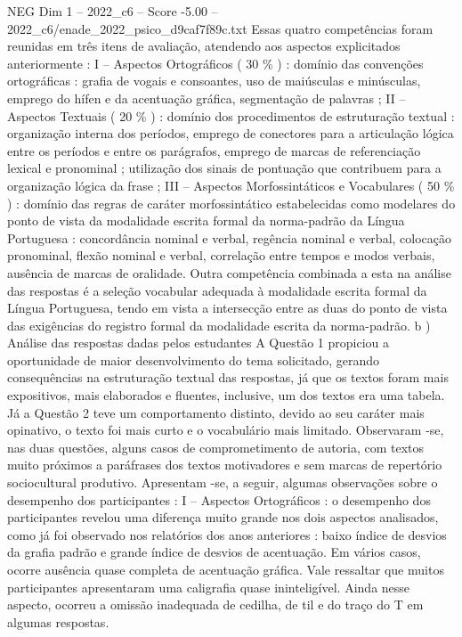 \begin{textsample}{NEG Dim 1 – 2022\_c6 – Score -5.00 – 2022\_c6/enade\_2022\_psico\_d9caf7f89c.txt}
Essas quatro competências foram reunidas em três itens de avaliação, atendendo aos aspectos explicitados anteriormente : I – Aspectos Ortográficos ( 30 \% ) : domínio das convenções ortográficas : grafia de vogais e consoantes, uso de maiúsculas e minúsculas, emprego do hífen e da acentuação gráfica, segmentação de palavras ; II – Aspectos Textuais ( 20 \% ) : domínio dos procedimentos de estruturação textual : organização interna dos períodos, emprego de conectores para a articulação lógica entre os períodos e entre os parágrafos, emprego de marcas de referenciação lexical e pronominal ; utilização dos sinais de pontuação que contribuem para a organização lógica da frase ; III – Aspectos Morfossintáticos e Vocabulares ( 50 \% ) : domínio das regras de caráter morfossintático estabelecidas como modelares do ponto de vista da modalidade escrita formal da norma-padrão da Língua Portuguesa : concordância nominal e verbal, regência nominal e verbal, colocação pronominal, flexão nominal e verbal, correlação entre tempos e modos verbais, ausência de marcas de oralidade.
Outra competência combinada a esta na análise das respostas é a seleção vocabular adequada à modalidade escrita formal da Língua Portuguesa, tendo em vista a intersecção entre as duas do ponto de vista das exigências do registro formal da modalidade escrita da norma-padrão. b ) Análise das respostas dadas pelos estudantes A Questão 1 propiciou a oportunidade de maior desenvolvimento do tema solicitado, gerando consequências na estruturação textual das respostas, já que os textos foram mais expositivos, mais elaborados e fluentes, inclusive, um dos textos era uma tabela.
Já a Questão 2 teve um comportamento distinto, devido ao seu caráter mais opinativo, o texto foi mais curto e o vocabulário mais limitado.
Observaram -se, nas duas questões, alguns casos de comprometimento de autoria, com textos muito próximos a paráfrases dos textos motivadores e sem marcas de repertório sociocultural produtivo.
Apresentam -se, a seguir, algumas observações sobre o desempenho dos participantes : I – Aspectos Ortográficos : o desempenho dos participantes revelou uma diferença muito grande nos dois aspectos analisados, como já foi observado nos relatórios dos anos anteriores : baixo índice de desvios da grafia padrão e grande índice de desvios de acentuação.
Em vários casos, ocorre ausência quase completa de acentuação gráfica.
Vale ressaltar que muitos participantes apresentaram uma caligrafia quase ininteligível.
Ainda nesse aspecto, ocorreu a omissão inadequada de cedilha, de til e do traço do T em algumas respostas.

\end{textsample}
